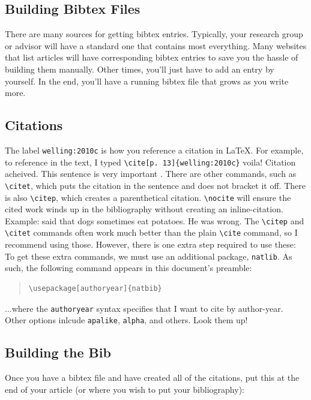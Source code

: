 \documentclass[12pt, letterpaper]{article}
\newcommand{\bslash}[0]{\textbackslash}
\begin{document}
\subsection{Building Bibtex Files}
There are many sources for getting bibtex entries.  Typically, your research 
group or advisor will have a standard one that contains most everything.  
Many websites that list articles will have corresponding bibtex entries to save
you the hassle of building them manually.  Other times, you'll just have to add
an entry by yourself.  In the end, you'll have a running bibtex file that grows
as you write more.

\subsection{Citations}
The label {\tt welling:2010c} is how you reference a citation in \LaTeX.  For 
example, to reference \cite[p. 13]{welling:2010c} in the text, I typed 
\verb+\cite[p. 13]{welling:2010c}+ voila!  Citation acheived.  This sentence is
very important \cite[]{dungey1961,axford1961,Parker:1960}.
There are other commands,
such as {\tt \bslash citet}, which puts the citation in the sentence and does 
not bracket it off.  There is also {\tt \bslash citep}, which creates a
parenthetical citation.
{\tt \bslash nocite} will ensure the cited work winds up 
in the bibliography without creating an inline-citation.
Example: \citet{welling:2011} said that dogs sometimes eat potatoes.
He was wrong.  The {\tt \bslash citep} and {\tt \bslash citet} commands often
work much better than the plain {\tt \bslash cite} command, so I recommend
using those.  However, there is one extra step required to use these:
To get these extra  commands, we must use an additional
package, {\tt natlib}.  As such, the following command appears in this
document's preamble:

\begin{quote}
\begin{verbatim}
\usepackage[authoryear]{natbib}
\end{verbatim}
\end{quote}

\noindent ...where the {\tt authoryear} syntax specifies that I want to cite
by author-year.  Other options inlcude {\tt apalike}, {\tt alpha}, and others.
Look them up!

\subsection{Building the Bib}
Once you have a bibtex file and have created all of the citations, put this at 
the end of your article (or where you wish to put your bibliography):
\end{document}
